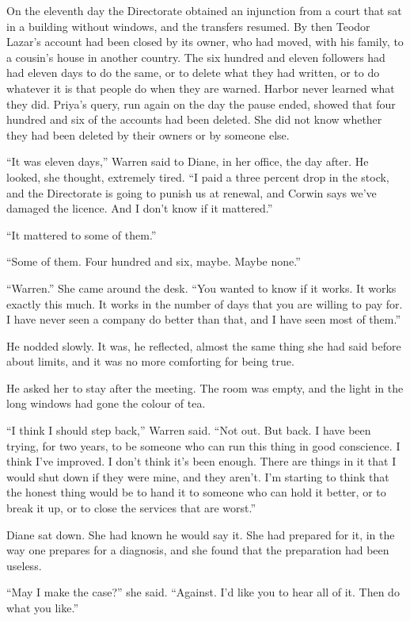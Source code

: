 On the eleventh day the Directorate obtained an injunction from a court that sat in a building without windows, and the transfers resumed. By then Teodor Lazar's account had been closed by its owner, who had moved, with his family, to a cousin's house in another country. The six hundred and eleven followers had had eleven days to do the same, or to delete what they had written, or to do whatever it is that people do when they are warned. Harbor never learned what they did. Priya's query, run again on the day the pause ended, showed that four hundred and six of the accounts had been deleted. She did not know whether they had been deleted by their owners or by someone else.

``It was eleven days,'' Warren said to Diane, in her office, the day after. He looked, she thought, extremely tired. ``I paid a three percent drop in the stock, and the Directorate is going to punish us at renewal, and Corwin says we've damaged the licence. And I don't know if it mattered.''

``It mattered to some of them.''

``Some of them. Four hundred and six, maybe. Maybe none.''

``Warren.'' She came around the desk. ``You wanted to know if it works. It works exactly this much. It works in the number of days that you are willing to pay for. I have never seen a company do better than that, and I have seen most of them.''

He nodded slowly. It was, he reflected, almost the same thing she had said before about limits, and it was no more comforting for being true.

\scenebreak
\noindent He asked her to stay after the meeting. The room was empty, and the light in the long windows had gone the colour of tea.

``I think I should step back,'' Warren said. ``Not out. But back. I have been trying, for two years, to be someone who can run this thing in good conscience. I think I've improved. I don't think it's been enough. There are things in it that I would shut down if they were mine, and they aren't. I'm starting to think that the honest thing would be to hand it to someone who can hold it better, or to break it up, or to close the services that are worst.''

Diane sat down. She had known he would say it. She had prepared for it, in the way one prepares for a diagnosis, and she found that the preparation had been useless.

``May I make the case?'' she said. ``Against. I'd like you to hear all of it. Then do what you like.''


